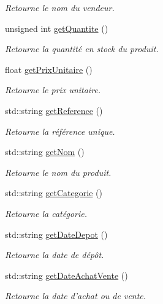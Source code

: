 \begin{DoxyCompactItemize}
\begin{DoxyCompactList}\small\item\em Retourne le nom du vendeur. \end{DoxyCompactList}\item 
unsigned int \hyperlink{class_produit_a4fc3e3d0c67b9b17e6c0e20cfec70c3b}{get\-Quantite} ()
\begin{DoxyCompactList}\small\item\em Retourne la quantité en stock du produit. \end{DoxyCompactList}\item 
float \hyperlink{class_produit_ae9e421815cd947b5ef56b751272a34ca}{get\-Prix\-Unitaire} ()
\begin{DoxyCompactList}\small\item\em Retourne le prix unitaire. \end{DoxyCompactList}\item 
std\-::string \hyperlink{class_produit_aaad2134211bc9caebb1abcefe5e096c5}{get\-Reference} ()
\begin{DoxyCompactList}\small\item\em Retourne la référence unique. \end{DoxyCompactList}\item 
std\-::string \hyperlink{class_produit_a6e4b2da75ac7c667bf1f70c124aea0ef}{get\-Nom} ()
\begin{DoxyCompactList}\small\item\em Retourne le nom du produit. \end{DoxyCompactList}\item 
std\-::string \hyperlink{class_produit_a9eff46fd98f73089223b7797a79f1a6c}{get\-Categorie} ()
\begin{DoxyCompactList}\small\item\em Retourne la catégorie. \end{DoxyCompactList}\item 
std\-::string \hyperlink{class_produit_af4d4f3cc1b83dbc521965ef3832f55db}{get\-Date\-Depot} ()
\begin{DoxyCompactList}\small\item\em Retourne la date de dépôt. \end{DoxyCompactList}\item 
std\-::string \hyperlink{class_produit_aa7f00c40483d9035023d5e2bfa3f7154}{get\-Date\-Achat\-Vente} ()
\begin{DoxyCompactList}\small\item\em Retourne la date d'achat ou de vente. \end{DoxyCompactList}\item 

\end{DoxyCompactItemize}
